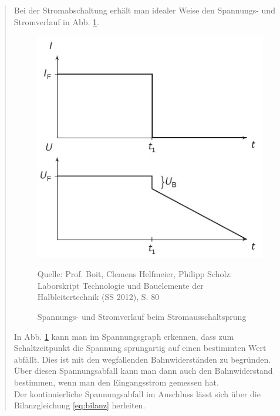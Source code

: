 \begin{quote}
    \vspace{2em} 
    
    Bei der Stromabschaltung erhält man idealer Weise den Spannungs- und 
    Stromverlauf in Abb. \ref{fig:Stromausschalten}.
   
    \vspace{2em}
    
    \begin{figure}[H]
        \centering
        \includegraphics[scale=1]{./SchaltverhaltenBilder/Stromausschalten.jpg}
        \caption{Spannungs- und Stromverlauf beim Stromausschaltsprung}
             \begin{center}
                 \small Quelle: Prof. Boit, Clemens Helfmeier, Philipp Scholz: Laborskript Technologie und Bauelemente der Halbleitertechnik (SS 2012), S. 80
             \end{center} 
        \label{fig:Stromausschalten}
    \end{figure}
    
    \vspace{2em} 
    
    In Abb. \ref{fig:Stromausschalten} kann man im Spannungsgraph erkennen, 
    dass zum Schaltzeitpunkt die Spannung sprungartig auf einen bestimmten Wert 
    abfällt. Dies ist mit den wegfallenden Bahnwiderständen zu begründen. Über 
    diesen Spannungsabfall kann man dann auch den Bahnwiderstand bestimmen, wenn
    man den Eingangsstrom gemessen hat.\\   
	Der kontinuierliche Spannungsabfall im Anschluss lässt sich über die 
	Bilanzgleichung \ref{eq:bilanz} herleiten.
	

\end{quote}
